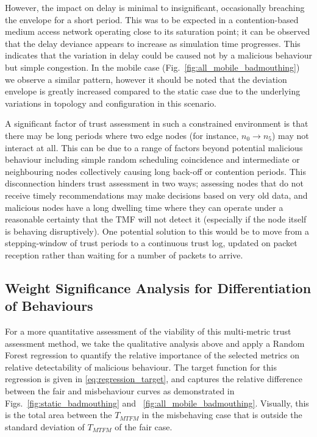 \documentclass[conference]{IEEEtran}
\begin{document}
However, the impact on delay is minimal to insignificant, occasionally breaching the envelope for a short period. 
This was to be expected in a contention-based medium access network operating close to its saturation point; it can be observed that the delay deviance appears to increase as simulation time progresses. 
This indicates that the variation in delay could be caused not by a malicious behaviour but simple congestion.
In the mobile case (Fig.~\ref{fig:all_mobile_badmouthing}) we observe a similar pattern, however it should be noted that the deviation envelope is greatly increased compared to the static case due to the underlying variations in topology and configuration in this scenario.

A significant factor of trust assessment in such a constrained environment is that there may be long periods where two edge nodes (for instance, $n_0 \to n_5$) may not interact at all. 
This can be due to a range of factors beyond potential malicious behaviour including simple random scheduling coincidence and intermediate or neighbouring nodes collectively causing long back-off or contention periods.
This disconnection hinders trust assessment in two ways; assessing nodes that do not receive timely recommendations may make decisions based on very old data, and malicious nodes have a long dwelling time where they can operate under a reasonable certainty that the TMF will not detect it (especially if the node itself is behaving disruptively).
One potential solution to this would be to move from a stepping-window of trust periods to a continuous trust log, updated on packet reception rather than waiting for a number of packets to arrive.

\subsection{Weight Significance Analysis for Differentiation of Behaviours}

For a more quantitative assessment of the viability of this multi-metric trust assessment method, we take the qualitative analysis above and apply a Random Forest regression\cite{Breiman2001} to quantify the relative importance of the selected metrics on relative detectability of malicious behaviour. 
The target function for this regression is given in \eqref{eq:regression_target}, and captures the relative difference between the fair and misbehaviour curves as demonstrated in Figs.~\ref{fig:static_badmouthing} and ~\ref{fig:all_mobile_badmouthing}.
Visually, this is the total area between the $T_{MTFM}$ in the misbehaving case that is outside the standard deviation of $T_{MTFM}$ of the fair case.
\end{document}

